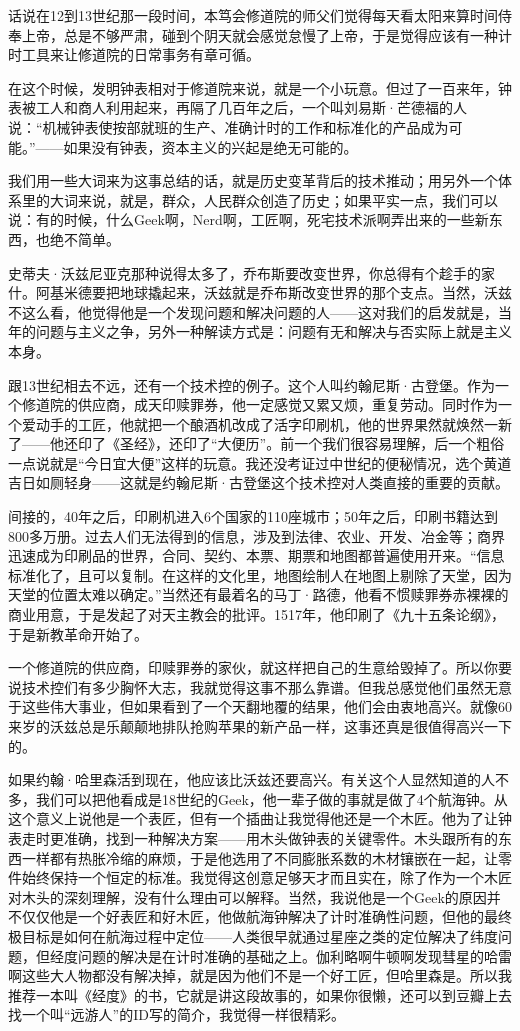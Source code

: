 话说在12到13世纪那一段时间，本笃会修道院的师父们觉得每天看太阳来算时间侍奉上帝，总是不够严肃，碰到个阴天就会感觉怠慢了上帝，于是觉得应该有一种计时工具来让修道院的日常事务有章可循。

在这个时候，发明钟表相对于修道院来说，就是一个小玩意。但过了一百来年，钟表被工人和商人利用起来，再隔了几百年之后，一个叫刘易斯·芒德福的人说：``机械钟表使按部就班的生产、准确计时的工作和标准化的产品成为可能。''------如果没有钟表，资本主义的兴起是绝无可能的。

我们用一些大词来为这事总结的话，就是历史变革背后的技术推动；用另外一个体系里的大词来说，就是，群众，人民群众创造了历史；如果平实一点，我们可以说：有的时候，什么Geek啊，Nerd啊，工匠啊，死宅技术派啊弄出来的一些新东西，也绝不简单。

史蒂夫·沃兹尼亚克那种说得太多了，乔布斯要改变世界，你总得有个趁手的家什。阿基米德要把地球撬起来，沃兹就是乔布斯改变世界的那个支点。当然，沃兹不这么看，他觉得他是一个发现问题和解决问题的人------这对我们的启发就是，当年的问题与主义之争，另外一种解读方式是：问题有无和解决与否实际上就是主义本身。

跟13世纪相去不远，还有一个技术控的例子。这个人叫约翰尼斯·古登堡。作为一个修道院的供应商，成天印赎罪券，他一定感觉又累又烦，重复劳动。同时作为一个爱动手的工匠，他就把一个酿酒机改成了活字印刷机，他的世界果然就焕然一新了------他还印了《圣经》，还印了``大便历''。前一个我们很容易理解，后一个粗俗一点说就是``今日宜大便''这样的玩意。我还没考证过中世纪的便秘情况，选个黄道吉日如厕轻身------这就是约翰尼斯·古登堡这个技术控对人类直接的重要的贡献。

间接的，40年之后，印刷机进入6个国家的110座城市；50年之后，印刷书籍达到800多万册。过去人们无法得到的信息，涉及到法律、农业、开发、冶金等；商界迅速成为印刷品的世界，合同、契约、本票、期票和地图都普遍使用开来。``信息标准化了，且可以复制。在这样的文化里，地图绘制人在地图上剔除了天堂，因为天堂的位置太难以确定。''当然还有最着名的马丁·路德，他看不惯赎罪券赤裸裸的商业用意，于是发起了对天主教会的批评。1517年，他印刷了《九十五条论纲》，于是新教革命开始了。

一个修道院的供应商，印赎罪券的家伙，就这样把自己的生意给毁掉了。所以你要说技术控们有多少胸怀大志，我就觉得这事不那么靠谱。但我总感觉他们虽然无意于这些伟大事业，但如果看到了一个天翻地覆的结果，他们会由衷地高兴。就像60来岁的沃兹总是乐颠颠地排队抢购苹果的新产品一样，这事还真是很值得高兴一下的。

如果约翰·哈里森活到现在，他应该比沃兹还要高兴。有关这个人显然知道的人不多，我们可以把他看成是18世纪的Geek，他一辈子做的事就是做了4个航海钟。从这个意义上说他是一个表匠，但有一个插曲让我觉得他还是一个木匠。他为了让钟表走时更准确，找到一种解决方案------用木头做钟表的关键零件。木头跟所有的东西一样都有热胀冷缩的麻烦，于是他选用了不同膨胀系数的木材镶嵌在一起，让零件始终保持一个恒定的标准。我觉得这创意足够天才而且实在，除了作为一个木匠对木头的深刻理解，没有什么理由可以解释。当然，我说他是一个Geek的原因并不仅仅他是一个好表匠和好木匠，他做航海钟解决了计时准确性问题，但他的最终极目标是如何在航海过程中定位------人类很早就通过星座之类的定位解决了纬度问题，但经度问题的解决是在计时准确的基础之上。伽利略啊牛顿啊发现彗星的哈雷啊这些大人物都没有解决掉，就是因为他们不是一个好工匠，但哈里森是。所以我推荐一本叫《经度》的书，它就是讲这段故事的，如果你很懒，还可以到豆瓣上去找一个叫``远游人''的ID写的简介，我觉得一样很精彩。

